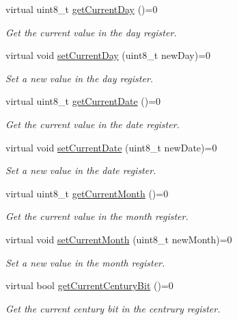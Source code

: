 \begin{DoxyCompactItemize}
virtual uint8\+\_\+t \mbox{\hyperlink{classreal_time_clock_a13b8ebc25275f183a1117402fc9e5e36}{get\+Current\+Day}} ()=0
\begin{DoxyCompactList}\small\item\em Get the current value in the day register. \end{DoxyCompactList}\item 
virtual void \mbox{\hyperlink{classreal_time_clock_a4a80a695cbb55860921f92509fae0cd0}{set\+Current\+Day}} (uint8\+\_\+t new\+Day)=0
\begin{DoxyCompactList}\small\item\em Set a new value in the day register. \end{DoxyCompactList}\item 
virtual uint8\+\_\+t \mbox{\hyperlink{classreal_time_clock_a910bce5ee911c18bd34a4154953ce2ac}{get\+Current\+Date}} ()=0
\begin{DoxyCompactList}\small\item\em Get the current value in the date register. \end{DoxyCompactList}\item 
virtual void \mbox{\hyperlink{classreal_time_clock_a7db563a518ae7b87ca6d77860906e517}{set\+Current\+Date}} (uint8\+\_\+t new\+Date)=0
\begin{DoxyCompactList}\small\item\em Set a new value in the date register. \end{DoxyCompactList}\item 
virtual uint8\+\_\+t \mbox{\hyperlink{classreal_time_clock_a24dd15babb345129fd995641946c5f2b}{get\+Current\+Month}} ()=0
\begin{DoxyCompactList}\small\item\em Get the current value in the month register. \end{DoxyCompactList}\item 
virtual void \mbox{\hyperlink{classreal_time_clock_a2edeb084630a78309bc574eceaf5d6ae}{set\+Current\+Month}} (uint8\+\_\+t new\+Month)=0
\begin{DoxyCompactList}\small\item\em Set a new value in the month register. \end{DoxyCompactList}\item 
virtual bool \mbox{\hyperlink{classreal_time_clock_ae0b15649f9135be8f0d9ada65084c28f}{get\+Current\+Century\+Bit}} ()=0
\begin{DoxyCompactList}\small\item\em Get the current century bit in the centrury register. \end{DoxyCompactList}\item 

\end{DoxyCompactItemize}
